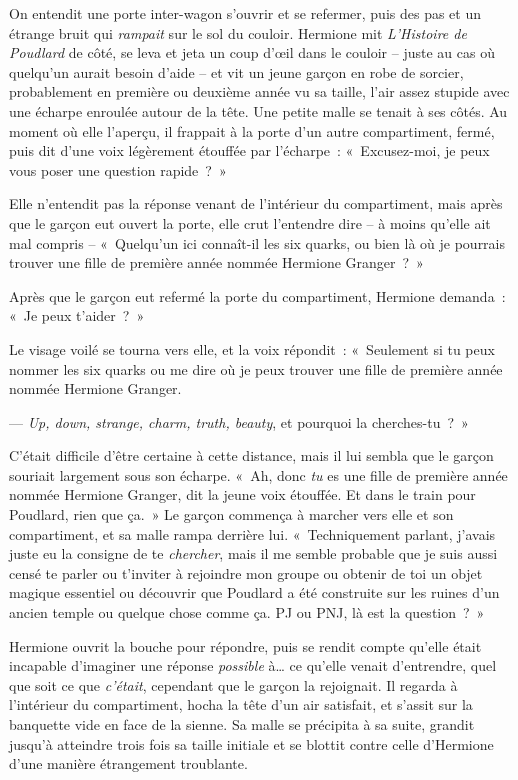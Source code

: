 On entendit une porte inter-wagon s'ouvrir et se refermer, puis des pas et un étrange bruit qui \emph{rampait} sur le sol du couloir.
Hermione mit \emph{L'Histoire de Poudlard} de côté, se leva et jeta un coup d'œil dans le couloir -- juste au cas où quelqu'un aurait besoin d'aide -- et vit un jeune garçon en robe de sorcier, probablement en première ou deuxième année vu sa taille, l'air assez stupide avec une écharpe enroulée autour de la tête.
Une petite malle se tenait à ses côtés.
Au moment où elle l'aperçu, il frappait à la porte d'un autre compartiment, fermé, puis dit d'une voix légèrement étouffée par l'écharpe~: «~Excusez-moi, je peux vous poser une question rapide~?~»

Elle n'entendit pas la réponse venant de l'intérieur du compartiment, mais après que le garçon eut ouvert la porte, elle crut l'entendre dire -- à moins qu'elle ait mal compris -- «~Quelqu'un ici connaît-il les six quarks, ou bien là où je pourrais trouver une fille de première année nommée Hermione Granger~?~»

Après que le garçon eut refermé la porte du compartiment, Hermione demanda~: «~Je peux t'aider~?~»

Le visage voilé se tourna vers elle, et la voix répondit~:
«~Seulement si tu peux nommer les six quarks ou me dire où je peux trouver une fille de première année nommée Hermione Granger.

---  \emph{Up, down, strange, charm, truth, beauty}, et pourquoi la cherches-tu~?~»

C'était difficile d'être certaine à cette distance, mais il lui sembla que le garçon souriait largement sous son écharpe.
«~Ah, donc \emph{tu} es une fille de première année nommée Hermione Granger, dit la jeune voix étouffée.
Et dans le train pour Poudlard, rien que ça.~»
Le garçon commença à marcher vers elle et son compartiment, et sa malle rampa derrière lui.
«~Techniquement parlant, j'avais juste eu la consigne de te \emph{chercher}, mais il me semble probable que je suis aussi censé te parler ou t'inviter à rejoindre mon groupe ou obtenir de toi un objet magique essentiel ou découvrir que Poudlard a été construite sur les ruines d'un ancien temple ou quelque chose comme ça.
PJ ou PNJ, là est la question~?~»

Hermione ouvrit la bouche pour répondre, puis se rendit compte qu'elle était incapable d'imaginer une réponse \emph{possible} à…
ce qu'elle venait d'entrendre, quel que soit ce que \emph{c'était}, cependant que le garçon la rejoignait.
Il regarda à l'intérieur du compartiment, hocha la tête d'un air satisfait, et s'assit sur la banquette vide en face de la sienne.
Sa malle se précipita à sa suite, grandit jusqu'à atteindre trois fois sa taille initiale et se blottit contre celle d'Hermione d'une manière étrangement troublante.

